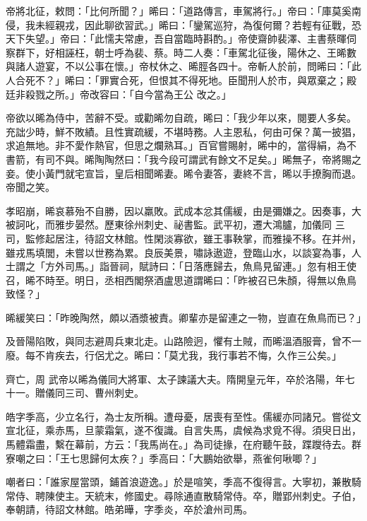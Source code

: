 \begin{pinyinscope}
 帝將北征，敕問：「比何所聞？」晞曰：「道路傳言，車駕將行。」帝曰：「庫莫奚南侵，我未經親戎，因此聊欲習武。」晞曰：「鑾駕巡狩，為復何爾？若輕有征戰，恐天下失望。」帝曰：「此懦夫常慮，吾自當臨時斟酌。」帝使齋帥裴澤、主書蔡暉伺察群下，好相誣枉，朝士呼為裴、蔡。時二人奏：「車駕北征後，陽休之、王晞數與諸人遊宴，不以公事在懷。」帝杖休之、晞脛各四十。帝斬人於前，問晞曰：「此人合死不？」晞曰：「罪實合死，但恨其不得死地。臣聞刑人於市，與眾棄之；殿廷非殺戮之所。」帝改容曰：「自今當為王公
 改之。」



 帝欲以晞為侍中，苦辭不受。或勸晞勿自疏，晞曰：「我少年以來，閱要人多矣。充詘少時，鮮不敗績。且性實疏緩，不堪時務。人主恩私，何由可保？萬一披猖，求追無地。非不愛作熱官，但思之爛熟耳。」百官嘗賜射，晞中的，當得絹，為不書箭，有司不與。晞陶陶然曰：「我今段可謂武有餘文不足矣。」晞無子，帝將賜之妾。使小黃門就宅宣旨，皇后相聞晞妻。晞令妻答，妻終不言，晞以手撩胸而退。帝聞之笑。



 孝昭崩，晞哀慕殆不自勝，因以羸敗。武成本忿其儒緩，由是彌嫌之。因奏事，大被訶叱，而雅步晏然。歷東徐州刺史、祕書監。武平初，遷大鴻臚，加儀同
 三司，監修起居注，待詔文林館。性閑淡寡欲，雖王事鞅掌，而雅操不移。在并州，雖戎馬填閭，未嘗以世務為累。良辰美景，嘯詠遨遊，登臨山水，以談宴為事，人士謂之「方外司馬。」詣晉祠，賦詩曰：「日落應歸去，魚鳥見留連。」忽有相王使召，晞不時至。明日，丞相西閣祭酒盧思道謂晞曰：「昨被召已朱顏，得無以魚鳥致怪？」



 晞緩笑曰：「昨晚陶然，頗以酒漿被責。卿輩亦是留連之一物，豈直在魚鳥而已？」



 及晉陽陷敗，與同志避周兵東北走。山路險迥，懼有土賊，而晞溫酒服膏，曾不一廢。每不肯疾去，行侶尤之。晞曰：「莫尤我，我行事若不悔，久作三公矣。」



 齊亡，周
 武帝以晞為儀同大將軍、太子諫議大夫。隋開皇元年，卒於洛陽，年七十一。贈儀同三司、曹州刺史。



 皓字季高，少立名行，為士友所稱。遭母憂，居喪有至性。儒緩亦同諸兄。嘗從文宣北征，乘赤馬，旦蒙霜氣，遂不復識。自言失馬，虞候為求覓不得。須臾日出，馬體霜盡，繫在幕前，方云：「我馬尚在。」為司徒掾，在府聽午鼓，蹀躞待去。群寮嘲之曰：「王七思歸何太疾？」季高曰：「大鵬始欲舉，燕雀何啾唧？」



 嘲者曰：「誰家屋當頭，鋪首浪遊逸。」於是喧笑，季高不復得言。大寧初，兼散騎常侍、聘陳使主。天統末，修國史。尋除通直散騎常侍。卒，贈郢州刺史。子伯，
 奉朝請，待詔文林館。皓弟曄，字季炎，卒於滄州司馬。




\end{pinyinscope}
